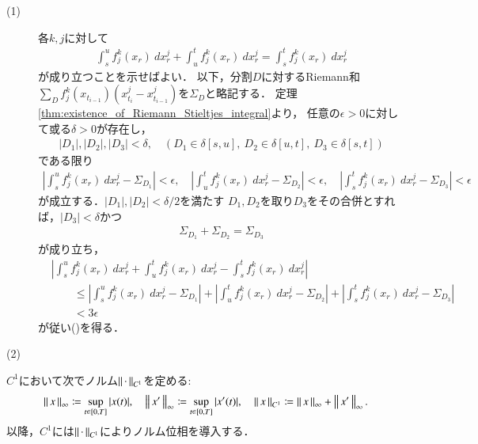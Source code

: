 \begin{prf}\mbox{}
	\begin{description}
		\item[(1)] 
			各$k,j$に対して
			\begin{align}
				\int_s^u f^k_j(x_r)\ dx^j_r
				+ \int_u^t f^k_j(x_r)\ dx^j_r
				= \int_s^t f^k_j(x_r)\ dx^j_r
				\label{eq:thm_linearity_of_Riemann_Stieltjes_integral_1}
			\end{align}
			が成り立つことを示せばよい．
			以下，分割$D$に対するRiemann和$\sum_D f^k_j(x_{t_{i-1}})(x^j_{t_i} - x^j_{t_{i-1}})$を$\Sigma_D$と略記する．
			定理\ref{thm:existence_of_Riemann_Stieltjes_integral}より，
			任意の$\epsilon > 0$に対して或る$\delta > 0$が存在し，
			\begin{align}
				|D_1|,|D_2|,|D_3| < \delta,
				\quad \left(D_1 \in \delta[s,u],\ D_2 \in \delta[u,t],\ D_3 \in \delta[s,t] \right)
			\end{align}
			である限り
			\begin{align}
				\left| \int_s^u f^k_j(x_r)\ dx^j_r - \Sigma_{D_1} \right| < \epsilon,
				\quad \left| \int_u^t f^k_j(x_r)\ dx^j_r - \Sigma_{D_2} \right| < \epsilon,
				\quad \left| \int_s^t f^k_j(x_r)\ dx^j_r - \Sigma_{D_3} \right| < \epsilon
			\end{align}
			が成立する．$|D_1|,|D_2| < \delta/2$を満たす
			$D_1,D_2$を取り$D_3$をその合併とすれば，$|D_3| < \delta$かつ
			\begin{align}
				\Sigma_{D_1} + \Sigma_{D_2} = \Sigma_{D_3}
			\end{align}
			が成り立ち，
			\begin{align}
				&\left| \int_s^u f^k_j(x_r)\ dx^j_r + \int_u^t f^k_j(x_r)\ dx^j_r
					- \int_s^t f^k_j(x_r)\ dx^j_r \right| \\
				&\qquad \leq \left| \int_s^u f^k_j(x_r)\ dx^j_r - \Sigma_{D_1} \right|
				+ \left| \int_u^t f^k_j(x_r)\ dx^j_r - \Sigma_{D_2} \right|
				+ \left| \int_s^t f^k_j(x_r)\ dx^j_r - \Sigma_{D_3} \right| \\
				&\qquad < 3\epsilon
			\end{align}
			が従い()を得る．
		
		\item[(2)]
	\end{description}
\end{prf}
$C^1$において次でノルム$\left\|\, \cdot\, \right\|_{C^1}$を定める:
\begin{align}
	\left\|\, x\, \right\|_{\infty} \coloneqq \operatorname*{sup}_{t \in [0,T]} |x(t)|,
	\quad \left\|\, x'\, \right\|_{\infty} \coloneqq \operatorname*{sup}_{t \in [0,T]} |x'(t)|,
	\quad \left\|\, x\, \right\|_{C^1} \coloneqq
	\left\|\, x\, \right\|_{\infty} + \left\|\, x'\, \right\|_{\infty}.
\end{align}
以降，$C^1$には$\left\|\, \cdot\, \right\|_{C^1}$によりノルム位相を導入する．

